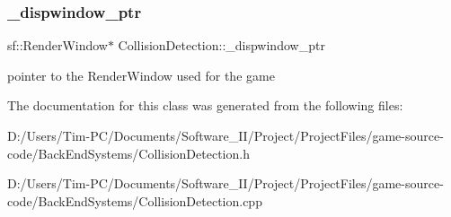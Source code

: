 \subsubsection{\texorpdfstring{\+\_\+dispwindow\+\_\+ptr}{\_dispwindow\_ptr}}
{\footnotesize\ttfamily sf\+::\+Render\+Window$\ast$ Collision\+Detection\+::\+\_\+dispwindow\+\_\+ptr\hspace{0.3cm}{\ttfamily [private]}}

pointer to the Render\+Window used for the game 

The documentation for this class was generated from the following files\+:\begin{DoxyCompactItemize}
\item 
D\+:/\+Users/\+Tim-\/\+P\+C/\+Documents/\+Software\+\_\+\+I\+I/\+Project/\+Project\+Files/game-\/source-\/code/\+Back\+End\+Systems/Collision\+Detection.\+h\item 
D\+:/\+Users/\+Tim-\/\+P\+C/\+Documents/\+Software\+\_\+\+I\+I/\+Project/\+Project\+Files/game-\/source-\/code/\+Back\+End\+Systems/Collision\+Detection.\+cpp\end{DoxyCompactItemize}
